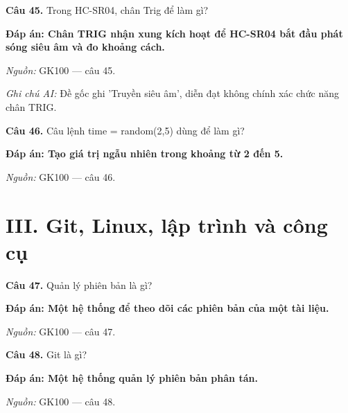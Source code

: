 \documentclass[11pt,a4paper]{article}
\begin{document}
\textbf{Câu 45.} Trong HC-SR04, chân Trig để làm gì?\par
{\color{answer}\textbf{Đáp án: Chân TRIG nhận xung kích hoạt để HC-SR04 bắt đầu phát sóng siêu âm và đo khoảng cách.}}\par
{\footnotesize\color{sourcegray}\textit{Nguồn:} GK100 — câu 45.\par}
{\footnotesize\color{sourcegray}\textit{Ghi chú AI:} Đề gốc ghi 'Truyền siêu âm', diễn đạt không chính xác chức năng chân TRIG.\par}
\vspace{3pt}\par\noindent{\color{black!18}\rule{\linewidth}{0.3pt}}\par\medskip

\textbf{Câu 46.} Câu lệnh time = random(2,5) dùng để làm gì?\par
{\color{answer}\textbf{Đáp án: Tạo giá trị ngẫu nhiên trong khoảng từ 2 đến 5.}}\par
{\footnotesize\color{sourcegray}\textit{Nguồn:} GK100 — câu 46.\par}
\vspace{3pt}\par\noindent{\color{black!18}\rule{\linewidth}{0.3pt}}\par\medskip

\section*{III. Git, Linux, lập trình và công cụ}

\textbf{Câu 47.} Quản lý phiên bản là gì?\par
{\color{answer}\textbf{Đáp án: Một hệ thống để theo dõi các phiên bản của một tài liệu.}}\par
{\footnotesize\color{sourcegray}\textit{Nguồn:} GK100 — câu 47.\par}
\vspace{3pt}\par\noindent{\color{black!18}\rule{\linewidth}{0.3pt}}\par\medskip

\textbf{Câu 48.} Git là gì?\par
{\color{answer}\textbf{Đáp án: Một hệ thống quản lý phiên bản phân tán.}}\par
{\footnotesize\color{sourcegray}\textit{Nguồn:} GK100 — câu 48.\par}
\vspace{3pt}\par\noindent{\color{black!18}\rule{\linewidth}{0.3pt}}\par\medskip
\end{document}
